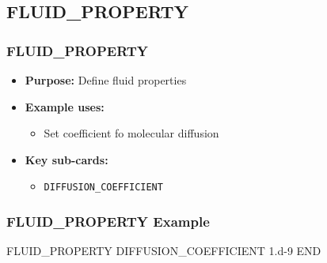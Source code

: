 \subsection{FLUID\_PROPERTY}

\begin{frame}\frametitle{FLUID\_PROPERTY}

\begin{itemize}
\item[] \textbf{Purpose:} Define fluid properties
\item[] \textbf{Example uses:}
\begin{itemize}
  \item Set coefficient fo molecular diffusion
\end{itemize}
\item[] \textbf{Key sub-cards:}
\begin{itemize}
  \item[] \verb|DIFFUSION_COEFFICIENT|
\end{itemize}
\end{itemize}

\end{frame}

\begin{frame}[fragile]\frametitle{FLUID\_PROPERTY Example}

\begin{semiverbatim}
FLUID_PROPERTY 
  DIFFUSION_COEFFICIENT 1.d-9
END
\end{semiverbatim}

\end{frame}

